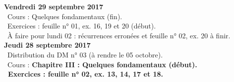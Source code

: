 \documentclass[12pt,a4paper]{article}
\begin{document}
%  
% 
% 
% 

\noindent\textbf{Vendredi 29 septembre 2017}\\
\bu\ Cours : Quelques fondamentaux (fin).\\
\bu\ Exercices : feuille n° 01, ex. 16, 19 et 20 (début).\\
\bu\ À faire pour lundi 02 : récurrences erronées et feuille n° 02, ex. 20 à finir.\vspace{.4cm}\\

\noindent\textbf{Jeudi 28 septembre 2017}\\
\bu\ Distribution du DM n° 03 (à rendre le 05 octobre).\\
\bu\ Cours : \bf Chapitre III \rm : Quelques fondamentaux (début).\\
\bu\ Exercices : feuille n° 02, ex. 13, 14, 17 et 18.\vspace{.4cm}\\
\end{document}
